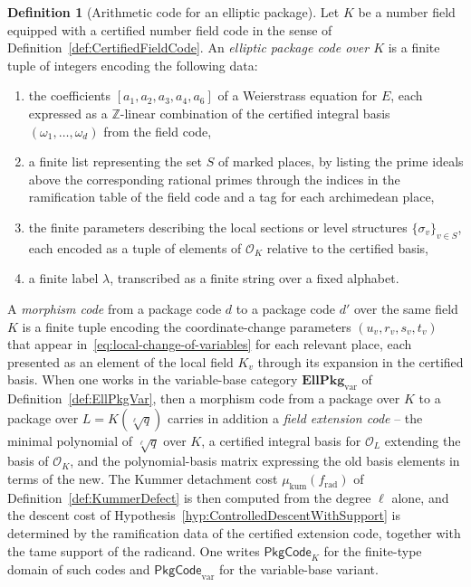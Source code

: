 \documentclass[10pt, reqno]{amsart}
\theoremstyle{plain}
\theoremstyle{definition}
\newtheorem{definition}[theorem]{Definition}
\theoremstyle{plain}
\newcommand{\Z}{\mathbb{Z}}
\begin{document}
\begin{definition}[Arithmetic code for an elliptic package]\label{def:EllPkgCode}
Let $K$ be a number field equipped with a certified number field code in the sense of Definition~\ref{def:CertifiedFieldCode}. An \emph{elliptic package code over $K$} is a finite tuple of integers encoding the following data:
\begin{enumerate}
\item[\textit{(i)}] the coefficients $[a_1,a_2,a_3,a_4,a_6]$ of a Weierstrass equation for $E$, each expressed as a $\Z$-linear combination of the certified integral basis $(\omega_1,\dots,\omega_d)$ from the field code,
\item[\textit{(ii)}] a finite list representing the set $S$ of marked places, by listing the prime ideals above the corresponding rational primes through the indices in the ramification table of the field code and a tag for each archimedean place,
\item[\textit{(iii)}] the finite parameters describing the local sections or level structures $\{\sigma_v\}_{v\in S}$, each encoded as a tuple of elements of $\mathcal{O}_K$ relative to the certified basis,
\item[\textit{(iv)}] a finite label $\lambda$, transcribed as a finite string over a fixed alphabet.
\end{enumerate}
A \emph{morphism code} from a package code $d$ to a package code $d'$ over the same field $K$ is a finite tuple encoding the coordinate-change parameters $(u_v, r_v, s_v, t_v)$ that appear in~\eqref{eq:local-change-of-variables} for each relevant place, each presented as an element of the local field $K_v$ through its expansion in the certified basis. When one works in the variable-base category $\mathbf{EllPkg}_{\mathrm{var}}$ of Definition~\ref{def:EllPkgVar}, then a morphism code from a package over $K$ to a package over $L = K(\sqrt[\ell]{q})$ carries in addition a \emph{field extension code} -- the minimal polynomial of $\sqrt[\ell]{q}$ over $K$, a certified integral basis for $\mathcal{O}_L$ extending the basis of $\mathcal{O}_K$, and the polynomial-basis matrix expressing the old basis elements in terms of the new. The Kummer detachment cost $\mu_{\mathrm{kum}}(f_{\mathrm{rad}})$ of Definition~\ref{def:KummerDefect} is then computed from the degree $\ell$ alone, and the descent cost of Hypothesis~\ref{hyp:ControlledDescentWithSupport} is determined by the ramification data of the certified extension code, together with the tame support of the radicand. One writes $\mathsf{PkgCode}_K$ for the finite-type domain of such codes and $\mathsf{PkgCode}_{\mathrm{var}}$ for the variable-base variant.
\end{definition}
\end{document}
